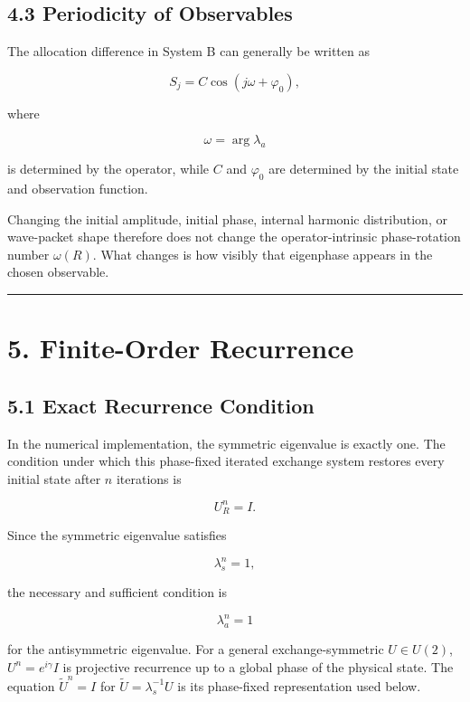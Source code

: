 \documentclass[
  a4paper,
  10pt]{article}
\begin{document}
\subsection{4.3 Periodicity of
Observables}\label{43-periodicity-of-observables}

The allocation difference in System B can generally be written as

\[
S_j=C\cos(j\omega+\varphi_0),
\]

where

\[
\omega=\arg\lambda_a
\]

is determined by the operator, while \(C\) and \(\varphi_0\) are
determined by the initial state and observation function.

Changing the initial amplitude, initial phase, internal harmonic
distribution, or wave-packet shape therefore does not change the
operator-intrinsic phase-rotation number \(\omega(R)\). What changes is
how visibly that eigenphase appears in the chosen observable.

\begin{center}\rule{0.5\linewidth}{0.5pt}\end{center}

\section{5. Finite-Order Recurrence}\label{5-finite-order-recurrence}

\subsection{5.1 Exact Recurrence
Condition}\label{51-exact-recurrence-condition}

In the numerical implementation, the symmetric eigenvalue is exactly
one. The condition under which this phase-fixed iterated exchange system
restores every initial state after \(n\) iterations is

\[
U_R^n=I.
\]

Since the symmetric eigenvalue satisfies

\[
\lambda_s^n=1,
\]

the necessary and sufficient condition is

\[
\lambda_a^n=1
\]

for the antisymmetric eigenvalue. For a general exchange-symmetric
\(U\in U(2)\), \(U^n=e^{i\gamma}I\) is projective recurrence up to a
global phase of the physical state. The equation \(\widetilde U^n=I\)
for \(\widetilde U=\lambda_s^{-1}U\) is its phase-fixed representation
used below.
\end{document}
